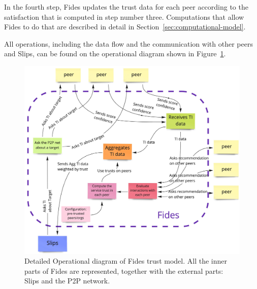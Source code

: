 In the fourth step, Fides updates the trust data for each peer according to the satisfaction that is computed in step number three.
Computations that allow Fides to do that are described in detail in Section~\ref{sec:computational-model}.

All operations, including the data flow and the communication with other peers and Slips, can be found on the operational diagram shown in Figure~\ref{fig:trust-model-operational-diagram}.

\begin{figure}[h]
    \centering
    \includegraphics[width=1.0\textwidth]{assets/fides_operational_diagram.jpeg}
    \caption{Detailed Operational diagram of Fides trust model. All the inner parts of Fides are represented, together with the external parts: Slips and the P2P network.}
    \label{fig:trust-model-operational-diagram}
\end{figure}